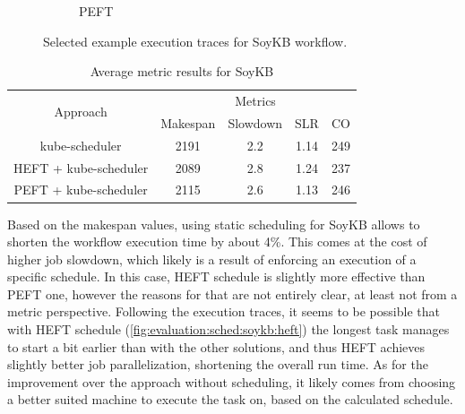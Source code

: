 \begin{figure}[H]
\begin{subfigure}{0.75\textwidth}
\caption[Selected example execution traces for SoyKB workflow with PEFT]{PEFT}
\label{fig:evaluation:sched:soykb:peft}
\end{subfigure}
\centering
\caption[Selected example execution traces for SoyKB workflow]{Selected example execution traces for SoyKB workflow.}
\label{fig:evaluation:sched:soykb}
\end{figure}


\begin{table}[H]
    \centering
    \begin{tabular}{|c|c|c|c|c|}
    \cline{1-5}
        \multirow{2}{*}{Approach} 
        &
        \multicolumn{4}{|c|}{Metrics} \\
    \cline{2-5}
        & Makespan & Slowdown & SLR & CO \\
    \cline{1-5}
        kube-scheduler & 2191 & 2.2 & 1.14 & 249 \\
    \cline{1-5}
        HEFT + kube-scheduler & 2089 & 2.8 & 1.24 & 237  \\
    \cline{1-5}
        PEFT + kube-scheduler & 2115 & 2.6 & 1.13 & 246 \\
    \cline{1-5}
    \end{tabular}
    \caption{Average metric results for SoyKB}
    \label{tab:metrics-sched-soykb}
\end{table}


Based on the makespan values, using static scheduling for SoyKB allows to shorten the workflow execution time by about 4\%.
This comes at the cost of higher job slowdown, which likely is a result of enforcing an execution of a specific schedule.
In this case, HEFT schedule is slightly more effective than PEFT one, however the reasons for that are not entirely clear, at least not from a metric perspective.
Following the execution traces, it seems to be possible that with HEFT schedule (\cref{fig:evaluation:sched:soykb:heft}) the longest task manages to start a bit earlier than with the other solutions, and thus HEFT achieves slightly better job parallelization, shortening the overall run time.
As for the improvement over the approach without scheduling, it likely comes from choosing a better suited machine to execute the task on, based on the calculated schedule.



